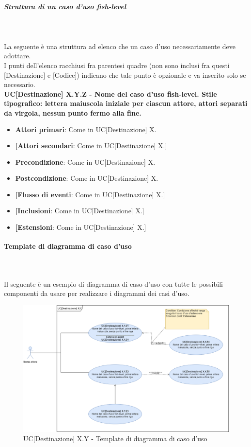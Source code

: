 \subparagraph*{Struttura di un caso d'uso fish-level}\mbox{}\\ \\
La seguente è una struttura ad elenco che un caso d'uso  necessariamente deve adottare.\\
I punti dell'elenco racchiusi fra parentesi quadre (non sono inclusi fra questi [Destinazione] e [Codice]) indicano che tale punto è opzionale e va inserito solo se necessario.\\
\textbf{UC[Destinazione] X.Y.Z - Nome del caso d'uso fish-level. Stile tipografico: lettera maiuscola iniziale per ciascun attore, attori separati da virgola, nessun punto fermo alla fine.}%
\begin{itemize}
	\item \textbf{Attori primari}: Come in UC[Destinazione] X.
	\item \textbf{[Attori secondari}: Come in UC[Destinazione] X.]
	\item \textbf{Precondizione}: Come in UC[Destinazione] X.
	\item \textbf{Postcondizione}: Come in UC[Destinazione] X.
	\item \textbf{[Flusso di eventi}: Come in UC[Destinazione] X.]
	\item \textbf{[Inclusioni}: Come in UC[Destinazione] X.]
	\item \textbf{[Estensioni}: Come in UC[Destinazione] X.]
\end{itemize}

\paragraph{Template di diagramma di caso d'uso}\mbox{}\\ \\
Il seguente è un esempio di diagramma di caso d'uso con tutte le possibili componenti  da usare per realizzare i diagrammi dei casi d'uso.
\begin{figure}[h]
	\centering	
	\includegraphics[scale=0.45]{Immagini/TemplateSchemaUseCase.png}
	\caption{UC[Destinazione] X.Y - Template di diagramma di caso d'uso}
\end{figure}

